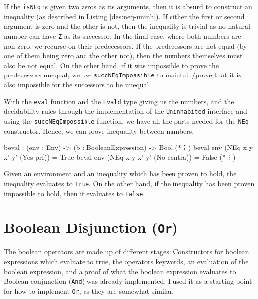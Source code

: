     If the \texttt{isNEq} is given two zeros as its arguments, then it is absurd to construct an inequality (as described in Listing \ref{des:neq-uninh}). If either the first or second argument is zero and the other is not, then the inequality is trivial as no natural number can have \texttt{Z} as its successor. In the final case, where both numbers are non-zero, we recurse on their predecessors. If the predecessors are not equal (by one of them being zero and the other not), then the numbers themselves must also be not equal. On the other hand, if it was impossible to prove the predecessors unequal, we use \texttt{succNEqImpossible} to maintain/prove that it is also impossible for the successors to be unequal.
    \\\par
    
    With the \texttt{eval} function and the \texttt{Evald} type giving us the numbers, and the decidability rules through the implementation of the \texttt{Uninhabited} interface and using the \texttt{succNEqImpossible} function, we have all the parts needed for the \texttt{NEq} constructor. Hence, we can prove inequality between numbers.
    
    \begin{code}[caption={Evaluating \texttt{NEq} over an environment}, escapeinside={(*}{*)}]
        beval : (env : Env) -> (b : BooleanExpression) -> Bool
        (*\vdots*)
        beval env (NEq x y x' y' (Yes prf))   = True
        beval env (NEq x y x' y' (No contra)) = False
        (*\vdots*)
    \end{code}

    Given an environment and an inequality which has been proven to hold, the inequality evaluates to \texttt{True}. On the other hand, if the inequality has been proven impossible to hold, then it evaluates to \texttt{False}.
    
    
\section{Boolean Disjunction (\texttt{Or})}
    The boolean operators are made up of different stages: Constructors for boolean expressions which evaluate to true, the operators keywords, an evaluation of the boolean expression, and a proof of what the boolean expression evaluates to. Boolean conjunction (\texttt{And}) was already implemented. I used it as a starting point for how to implement \texttt{Or}, as they are somewhat similar.
    
